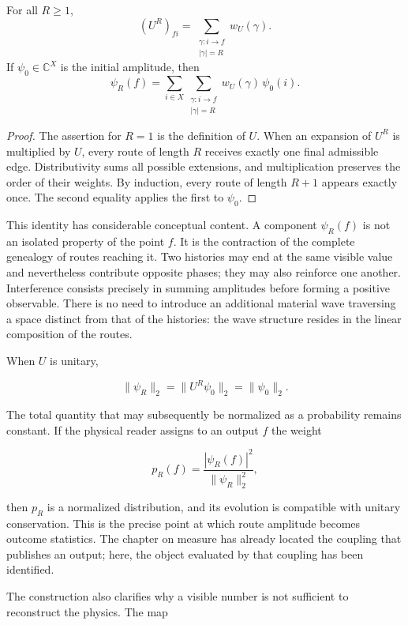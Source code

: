 \begin{theorem}
For all \(R\geq 1\),
\[
  (U^R)_{fi}
  =
  \sum_{\substack{\gamma:i\to f\\|\gamma|=R}}
  w_U(\gamma).
\]
If \(\psi_0\in\mathbb C^X\) is the initial amplitude, then
\[
  \psi_R(f)
  =
  \sum_{i\in X}
  \sum_{\substack{\gamma:i\to f\\|\gamma|=R}}
  w_U(\gamma)\,\psi_0(i).
\]
\end{theorem}

\begin{proof}
The assertion for \(R=1\) is the definition of \(U\). When an expansion
of \(U^R\) is multiplied by \(U\), every route of length \(R\) receives exactly one final
admissible edge. Distributivity sums all possible extensions, and
multiplication preserves the order of their weights. By induction, every route of length
\(R+1\) appears exactly once. The second equality applies the first to
\(\psi_0\).
\end{proof}

This identity has considerable conceptual content. A component
\(\psi_R(f)\) is not an isolated property of the point \(f\). It is the contraction of the
complete genealogy of routes reaching it. Two histories may end at the
same visible value and nevertheless contribute opposite phases; they may also
reinforce one another. Interference consists precisely in summing amplitudes before
forming a positive observable. There is no need to introduce an additional material wave
traversing a space distinct from that of the histories: the wave structure
resides in the linear composition of the routes.

When \(U\) is unitary,

\[
  \|\psi_R\|_2=\|U^R\psi_0\|_2=\|\psi_0\|_2.
\]

The total quantity that may subsequently be normalized as a probability remains
constant. If the physical reader assigns to an output \(f\) the weight

\[
  p_R(f)=\frac{|\psi_R(f)|^2}{\|\psi_R\|_2^2},
\]

then \(p_R\) is a normalized distribution, and its evolution is compatible with unitary conservation. This is the precise point at which route amplitude becomes outcome statistics. The chapter on measure has already located the coupling that publishes an output; here, the object evaluated by that coupling has been identified.

The construction also clarifies why a visible number is not sufficient to reconstruct
the physics. The map

